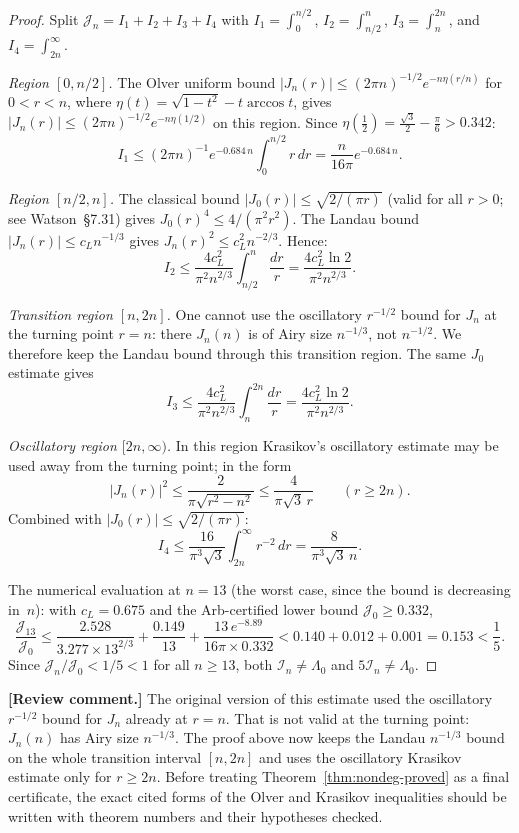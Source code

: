 \documentclass[12pt]{article}
\theoremstyle{definition}
\theoremstyle{remark}
\newcommand{\review}[1]{\par\smallskip\noindent\textbf{\color{red}[Review comment.]} {\color{red}#1}\par\smallskip}
\begin{document}
\begin{proof}
  Split $\mathcal J_n=I_1+I_2+I_3+I_4$ with
  $I_1=\int_0^{n/2}$, $I_2=\int_{n/2}^n$,
  $I_3=\int_n^{2n}$, and $I_4=\int_{2n}^\infty$.

  \emph{Region $[0,n/2]$.}  The Olver uniform bound
  $|J_n(r)|\leq(2\pi n)^{-1/2}e^{-n\eta(r/n)}$ for $0<r<n$, where
  $\eta(t)=\sqrt{1-t^2}-t\arccos t$, gives
  $|J_n(r)|\leq(2\pi n)^{-1/2}e^{-n\eta(1/2)}$ on this region.  Since
  $\eta(\tfrac12)=\tfrac{\sqrt{3}}{2}-\tfrac\pi6>0.342$:
  \[
    I_1\leq(2\pi n)^{-1}e^{-0.684\,n}\int_0^{n/2}r\,dr
    =\frac{n}{16\pi}e^{-0.684\,n}.
  \]

  \emph{Region $[n/2,n]$.}  The classical bound
  $|J_0(r)|\leq\sqrt{2/(\pi r)}$ (valid for all $r>0$; see
  Watson~\S7.31) gives $J_0(r)^4\leq 4/(\pi^2 r^2)$.  The Landau bound
  $|J_n(r)|\leq c_Ln^{-1/3}$ gives $J_n(r)^2\leq c_L^2n^{-2/3}$.
  Hence:
  \[
    I_2
    \leq\frac{4c_L^2}{\pi^2 n^{2/3}}\int_{n/2}^n\frac{dr}{r}
    =\frac{4c_L^2\ln 2}{\pi^2 n^{2/3}}.
  \]

  \emph{Transition region $[n,2n]$.}  One cannot use the oscillatory
  $r^{-1/2}$ bound for $J_n$ at the turning point $r=n$: there
  $J_n(n)$ is of Airy size $n^{-1/3}$, not $n^{-1/2}$.  We therefore
  keep the Landau bound through this transition region.  The same
  $J_0$ estimate gives
  \[
    I_3
    \leq\frac{4c_L^2}{\pi^2 n^{2/3}}\int_n^{2n}\frac{dr}{r}
    =\frac{4c_L^2\ln 2}{\pi^2 n^{2/3}}.
  \]

  \emph{Oscillatory region $[2n,\infty)$.}  In this region Krasikov's
  oscillatory estimate may be used away from the turning point; in the
  form
  \[
    |J_n(r)|^2\leq\frac{2}{\pi\sqrt{r^2-n^2}}
    \leq\frac{4}{\pi\sqrt3\,r}\qquad (r\geq2n).
  \]
  Combined with $|J_0(r)|\leq\sqrt{2/(\pi r)}$:
  \[
    I_4
    \leq\frac{16}{\pi^3\sqrt3}\int_{2n}^\infty r^{-2}\,dr
    =\frac{8}{\pi^3\sqrt3\,n}.
  \]

  The numerical evaluation at $n=13$ (the worst case, since the bound is
  decreasing in~$n$): with $c_L=0.675$ and the Arb-certified lower bound
  $\mathcal J_0\geq 0.332$,
  \[
    \frac{\mathcal J_{13}}{\mathcal J_0}
    \leq\frac{2.528}{3.277\times 13^{2/3}}
    +\frac{0.149}{13}
    +\frac{13\,e^{-8.89}}{16\pi\times 0.332}
    <0.140+0.012+0.001=0.153<\frac15.
  \]
  Since $\mathcal J_n/\mathcal J_0<1/5<1$ for all $n\geq 13$,
  both $\mathcal I_n\neq\Lambda_0$ and $5\mathcal I_n\neq\Lambda_0$.
\end{proof}

\review{The original version of this estimate used the oscillatory
$r^{-1/2}$ bound for $J_n$ already at $r=n$.  That is not valid at the
turning point: $J_n(n)$ has Airy size $n^{-1/3}$.  The proof above now
keeps the Landau $n^{-1/3}$ bound on the whole transition interval
$[n,2n]$ and uses the oscillatory Krasikov estimate only for
$r\geq2n$.  Before treating Theorem~\ref{thm:nondeg-proved} as a final
certificate, the exact cited forms of the Olver and Krasikov inequalities
should be written with theorem numbers and their hypotheses checked.}
\end{document}
